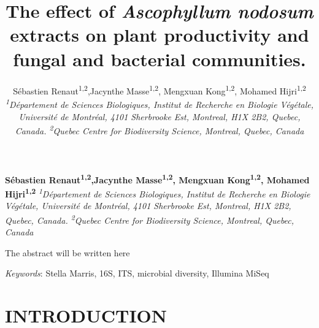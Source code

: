 \documentclass[11pt,]{article}
\title{\textbf{The effect of \emph{Ascophyllum nodosum} extracts on plant
productivity and fungal and bacterial communities.}  }
\author{\Large Sébastien Renaut\textsuperscript{1,2},Jacynthe
Masse\textsuperscript{1,2}, Mengxuan Kong\textsuperscript{1,2}, Mohamed
Hijri\textsuperscript{1,2}\vspace{0.05in} \newline\normalsize\emph{\textsuperscript{1}Département de Sciences Biologiques, Institut de
Recherche en Biologie Végétale, Université de Montréal, 4101 Sherbrooke
Est, Montreal, H1X 2B2, Quebec, Canada. \textsuperscript{2}Quebec Centre
for Biodiversity Science, Montreal, Quebec, Canada}  }
\date{}
\newcommand*{\authorfont}{\fontfamily{phv}\selectfont}
\renewenvironment{abstract}
 {{%
    \setlength{\leftmargin}{0mm}
    \setlength{\rightmargin}{\leftmargin}%
  }%
  \relax}
 {\endlist}
\begin{document}
	
%

{%
\setlength{\parindent}{0pt}
\thispagestyle{plain}
{\fontsize{18}{20}\selectfont\raggedright 
\maketitle  %

}

{
   \vskip 13.5pt\relax \normalsize\fontsize{11}{12} 
\textbf{\authorfont Sébastien Renaut\textsuperscript{1,2},Jacynthe
Masse\textsuperscript{1,2}, Mengxuan Kong\textsuperscript{1,2}, Mohamed
Hijri\textsuperscript{1,2}} \hskip 15pt \emph{\small \textsuperscript{1}Département de Sciences Biologiques, Institut de
Recherche en Biologie Végétale, Université de Montréal, 4101 Sherbrooke
Est, Montreal, H1X 2B2, Quebec, Canada. \textsuperscript{2}Quebec Centre
for Biodiversity Science, Montreal, Quebec, Canada}   

}

}








\begin{abstract}

    \hbox{\vrule height .2pt width 39.14pc}

    \vskip 8.5pt %

\noindent The abstract will be written here


\vskip 8.5pt \noindent \emph{Keywords}: Stella Marris, 16S, ITS, microbial diversity, Illumina MiSeq \par

    \hbox{\vrule height .2pt width 39.14pc}



\end{abstract}


\vskip 6.5pt


\noindent \doublespacing \newpage 

\section{INTRODUCTION}\label{introduction}
\end{document}
